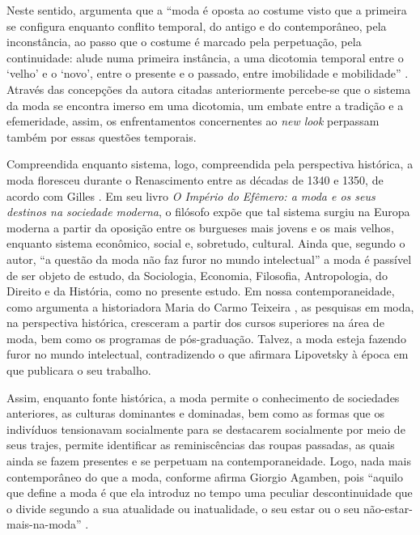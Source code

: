 \begin{refsection}
    Neste sentido, \textcite{Calanca2008Historia} argumenta que a ``moda é oposta ao costume visto que a primeira se configura enquanto conflito temporal, do antigo e do contemporâneo, pela inconstância, ao passo que o costume é marcado pela perpetuação, pela continuidade: alude numa primeira instância, a uma dicotomia temporal entre o `velho' e o `novo', entre o presente e o passado, entre imobilidade e mobilidade'' \cite[p.~11]{Calanca2008Historia}. Através das concepções da autora citadas anteriormente percebe-se que o sistema da moda se encontra imerso em uma dicotomia, um embate entre a tradição e a efemeridade, assim, os enfrentamentos concernentes ao \textit{new look} perpassam também por essas questões temporais.  

    Compreendida enquanto sistema, logo, compreendida pela perspectiva histórica, a moda floresceu durante o Renascimento entre as décadas de 1340 e 1350, de acordo com Gilles \textcite{Lipovetsky1989Imperio}. Em seu livro \textit{O Império do Efêmero: a moda e os seus destinos na sociedade moderna}, o filósofo expõe que tal sistema surgiu na Europa moderna a partir da oposição entre os burgueses mais jovens e os mais velhos, enquanto sistema econômico, social e, sobretudo, cultural. Ainda que, segundo o autor, ``a questão da moda não faz furor no mundo intelectual'' \cite[p.~13]{Lipovetsky1989Imperio} a moda é passível de ser objeto de estudo, da Sociologia, Economia, Filosofia, Antropologia, do Direito e da História, como no presente estudo. Em nossa contemporaneidade, como argumenta a historiadora Maria do Carmo Teixeira \textcite{Rainho2015Moda}, as pesquisas em moda, na perspectiva histórica, cresceram a partir dos cursos superiores na área de moda, bem como os programas de pós-graduação. Talvez, a moda esteja fazendo furor no mundo intelectual, contradizendo o que afirmara Lipovetsky à época em que publicara o seu trabalho.

    Assim, enquanto fonte histórica, a moda permite o conhecimento de sociedades anteriores, as culturas dominantes e dominadas, bem como as formas que os indivíduos tensionavam socialmente para se destacarem socialmente por meio de seus trajes, permite identificar as reminiscências das roupas passadas, as quais ainda se fazem presentes e se perpetuam na contemporaneidade. Logo, nada mais contemporâneo do que a moda, conforme afirma Giorgio Agamben, pois ``aquilo que define a moda é que ela introduz no tempo uma peculiar descontinuidade que o divide segundo a sua atualidade ou inatualidade, o seu estar ou o seu não-estar-mais-na-moda'' \citeyear[p.~66]{Agamben2009Conteporaneo}.


\end{refsection}
